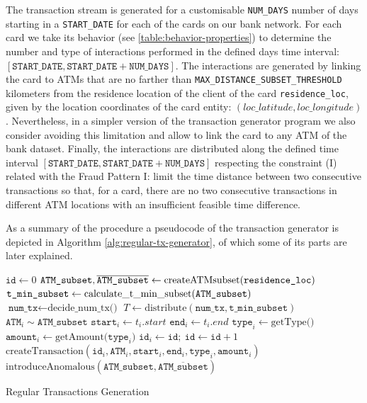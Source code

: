 The transaction stream is generated for a customisable \texttt{NUM\_DAYS} number of days starting in a \texttt{START\_DATE} for each of the cards on our bank network. For each card we take its behavior (see \ref{table:behavior-properties}) to determine the number and type of interactions performed in the defined days time interval: $[\texttt{START\_DATE}, \texttt{START\_DATE} + \texttt{NUM\_DAYS}]$. The interactions are generated by linking the card to ATMs that are no farther than \texttt{MAX\_DISTANCE\_SUBSET\_THRESHOLD} kilometers from the residence location of the client of the card \texttt{residence\_loc}, given by the location coordinates of the card entity: $(loc\_latitude, loc\_longitude)$. Nevertheless, in a simpler version of the transaction generator program we also consider avoiding this limitation and allow to link the card to any ATM of the bank dataset. Finally, the interactions are distributed along the defined time interval $[\texttt{START\_DATE}, \texttt{START\_DATE} + \texttt{NUM\_DAYS}]$ respecting the constraint (I) related with the Fraud Pattern I: limit the time distance between two consecutive transactions so that, for a card, there are no two consecutive transactions in different ATM locations with an insufficient feasible time difference.

As a summary of the procedure a pseudocode of the transaction generator is depicted in Algorithm \ref{alg:regular-tx-generator}, of which some of its parts are later explained.

\begin{algorithm}[H]
  \small
  \begin{algorithmic}[1]
  \STATE $\texttt{id} \gets 0$
    \STATE $\texttt{ATM\_subset}, \overline{\texttt{ATM\_subset}} \gets \text{createATMsubset(\texttt{residence\_loc})}$
    \STATE $\texttt{t\_min\_subset} \gets \text{calculate\_t\_min\_subset(\texttt{ATM\_subset})}$
    \STATE $\texttt{num\_tx} \gets \text{decide\_num\_tx()}$
    \STATE $T \gets \text{distribute}(\texttt{num\_tx}, \texttt{t\_min\_subset})$
        \STATE $\texttt{ATM}_{i} \sim \texttt{ATM\_subset}$
        \STATE $\texttt{start}_{i} \gets t_i.start$
        \STATE $\texttt{end}_{i} \gets t_i.end$
        \STATE $\texttt{type}_{i} \gets \text{getType()}$
        \STATE $\texttt{amount}_{i} \gets \text{getAmount(}\texttt{type}_{i}\text{)}$
        \STATE $\texttt{id}_{i} \gets \texttt{id}; \ \texttt{id} \gets \texttt{id} + 1$
        \STATE $\text{createTransaction}(\texttt{id}_{i}, \texttt{ATM}_i, \texttt{start}_{i},\texttt{end}_{i}, \texttt{type}_{i}, \texttt{amount}_i)$
    \ENDFOR
    \STATE $\text{introduceAnomalous}(\texttt{ATM\_subset}, \overline{\texttt{ATM\_subset}})$ 
  \ENDFOR
  \end{algorithmic}
  \caption{Regular Transactions Generation}
  \label{alg:regular-tx-generator}
\end{algorithm}

